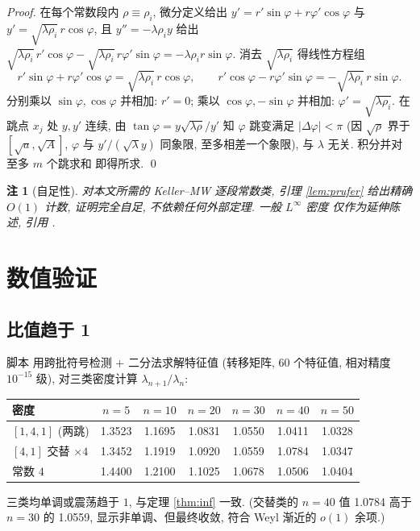 \documentclass[UTF8]{ctexart}
\newtheorem{remark}[theorem]{注}
\begin{document}
\begin{proof}
	在每个常数段内 $\rho \equiv \rho_i$, 微分定义给出
	$y' = r'\sin\varphi + r\varphi'\cos\varphi$ 与
	$y' = \sqrt{\lambda\rho_i}\, r\cos\varphi$, 且 $y'' = -\lambda\rho_i y$
	给出 $\sqrt{\lambda\rho_i}\,r'\cos\varphi
	- \sqrt{\lambda\rho_i}\,r\varphi'\sin\varphi
	= -\lambda\rho_i r\sin\varphi$. 消去 $\sqrt{\lambda\rho_i}$
	得线性方程组
	\[
		r'\sin\varphi + r\varphi'\cos\varphi
		= \sqrt{\lambda\rho_i}\,r\cos\varphi,
		\qquad
		r'\cos\varphi - r\varphi'\sin\varphi
		= -\sqrt{\lambda\rho_i}\,r\sin\varphi.
	\]
	分别乘以 $\sin\varphi, \cos\varphi$ 并相加: $r' = 0$;
	乘以 $\cos\varphi, -\sin\varphi$ 并相加: $\varphi' = \sqrt{\lambda\rho_i}$.
	在跳点 $x_j$ 处 $y, y'$ 连续, 由 $\tan\varphi = y\sqrt{\lambda\rho}/y'$
	知 $\varphi$ 跳变满足 $|\Delta\varphi| < \pi$ (因 $\sqrt\rho$
	界于 $[\sqrt a, \sqrt A]$, $\varphi$ 与 $y'/(\sqrt\lambda y)$ 同象限,
	至多相差一个象限), 与 $\lambda$ 无关. 积分并对至多 $m$ 个跳求和
	即得所求. \qed
\end{proof}



\begin{remark}[自足性]
	对本文所需的 Keller--MW 逐段常数类, 引理 \ref{lem:prufer} 给出精确
	$O(1)$ 计数, 证明完全自足, 不依赖任何外部定理. 一般 $L^\infty$ 密度
	仅作为延伸陈述, 引用 \cite{am1987}.
\end{remark}

\section{数值验证}

\subsection{比值趋于 1}

脚本  用跨批符号检测 + 二分法求解特征值
(转移矩阵, 60 个特征值, 相对精度 $10^{-15}$ 级), 对三类密度计算
$\lambda_{n+1}/\lambda_n$:
\begin{center}
\begin{tabular}{lcccccc}
	\toprule
	密度 & $n=5$ & $n=10$ & $n=20$ & $n=30$ & $n=40$ & $n=50$ \\
	\midrule
	$[1,4,1]$ (两跳) & 1.3523 & 1.1695 & 1.0831 & 1.0550 & 1.0411 & 1.0328 \\
	$[4,1]$ 交替 $\times4$ & 1.3452 & 1.1919 & 1.0920 & 1.0559 & 1.0784 & 1.0347 \\
	常数 $4$ & 1.4400 & 1.2100 & 1.1025 & 1.0678 & 1.0506 & 1.0404 \\
	\bottomrule
\end{tabular}
\end{center}
三类均单调或震荡趋于 $1$, 与定理 \ref{thm:inf} 一致. (交替类的
$n=40$ 值 1.0784 高于 $n=30$ 的 1.0559, 显示非单调、但最终收敛,
符合 Weyl 渐近的 $o(1)$ 余项.)
\end{document}
